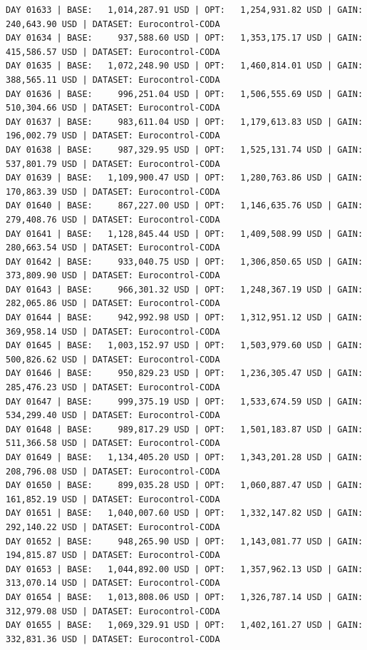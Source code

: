 \documentclass[11pt,a4paper]{article}
\begin{document}
\begin{verbatim}
DAY 01633 | BASE:   1,014,287.91 USD | OPT:   1,254,931.82 USD | GAIN: 240,643.90 USD | DATASET: Eurocontrol-CODA
DAY 01634 | BASE:     937,588.60 USD | OPT:   1,353,175.17 USD | GAIN: 415,586.57 USD | DATASET: Eurocontrol-CODA
DAY 01635 | BASE:   1,072,248.90 USD | OPT:   1,460,814.01 USD | GAIN: 388,565.11 USD | DATASET: Eurocontrol-CODA
DAY 01636 | BASE:     996,251.04 USD | OPT:   1,506,555.69 USD | GAIN: 510,304.66 USD | DATASET: Eurocontrol-CODA
DAY 01637 | BASE:     983,611.04 USD | OPT:   1,179,613.83 USD | GAIN: 196,002.79 USD | DATASET: Eurocontrol-CODA
DAY 01638 | BASE:     987,329.95 USD | OPT:   1,525,131.74 USD | GAIN: 537,801.79 USD | DATASET: Eurocontrol-CODA
DAY 01639 | BASE:   1,109,900.47 USD | OPT:   1,280,763.86 USD | GAIN: 170,863.39 USD | DATASET: Eurocontrol-CODA
DAY 01640 | BASE:     867,227.00 USD | OPT:   1,146,635.76 USD | GAIN: 279,408.76 USD | DATASET: Eurocontrol-CODA
DAY 01641 | BASE:   1,128,845.44 USD | OPT:   1,409,508.99 USD | GAIN: 280,663.54 USD | DATASET: Eurocontrol-CODA
DAY 01642 | BASE:     933,040.75 USD | OPT:   1,306,850.65 USD | GAIN: 373,809.90 USD | DATASET: Eurocontrol-CODA
DAY 01643 | BASE:     966,301.32 USD | OPT:   1,248,367.19 USD | GAIN: 282,065.86 USD | DATASET: Eurocontrol-CODA
DAY 01644 | BASE:     942,992.98 USD | OPT:   1,312,951.12 USD | GAIN: 369,958.14 USD | DATASET: Eurocontrol-CODA
DAY 01645 | BASE:   1,003,152.97 USD | OPT:   1,503,979.60 USD | GAIN: 500,826.62 USD | DATASET: Eurocontrol-CODA
DAY 01646 | BASE:     950,829.23 USD | OPT:   1,236,305.47 USD | GAIN: 285,476.23 USD | DATASET: Eurocontrol-CODA
DAY 01647 | BASE:     999,375.19 USD | OPT:   1,533,674.59 USD | GAIN: 534,299.40 USD | DATASET: Eurocontrol-CODA
DAY 01648 | BASE:     989,817.29 USD | OPT:   1,501,183.87 USD | GAIN: 511,366.58 USD | DATASET: Eurocontrol-CODA
DAY 01649 | BASE:   1,134,405.20 USD | OPT:   1,343,201.28 USD | GAIN: 208,796.08 USD | DATASET: Eurocontrol-CODA
DAY 01650 | BASE:     899,035.28 USD | OPT:   1,060,887.47 USD | GAIN: 161,852.19 USD | DATASET: Eurocontrol-CODA
DAY 01651 | BASE:   1,040,007.60 USD | OPT:   1,332,147.82 USD | GAIN: 292,140.22 USD | DATASET: Eurocontrol-CODA
DAY 01652 | BASE:     948,265.90 USD | OPT:   1,143,081.77 USD | GAIN: 194,815.87 USD | DATASET: Eurocontrol-CODA
DAY 01653 | BASE:   1,044,892.00 USD | OPT:   1,357,962.13 USD | GAIN: 313,070.14 USD | DATASET: Eurocontrol-CODA
DAY 01654 | BASE:   1,013,808.06 USD | OPT:   1,326,787.14 USD | GAIN: 312,979.08 USD | DATASET: Eurocontrol-CODA
DAY 01655 | BASE:   1,069,329.91 USD | OPT:   1,402,161.27 USD | GAIN: 332,831.36 USD | DATASET: Eurocontrol-CODA

\end{verbatim}
\end{document}
